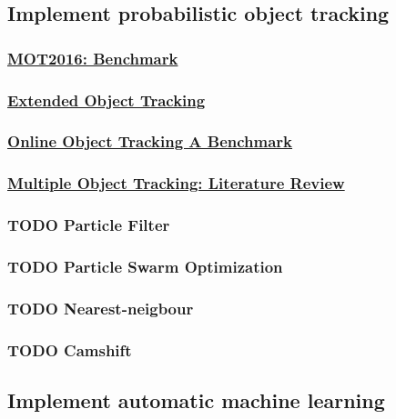 \documentclass[11pt]{article}
\begin{document}
\subsection{Implement probabilistic object tracking}
\label{sec:org3d32657}
\subsubsection{\href{https://arxiv.org/pdf/1603.00831.pdf}{MOT2016: Benchmark}}
\label{sec:orgb1dbb31}
\subsubsection{\href{https://arxiv.org/pdf/1604.00970.pdf}{Extended Object Tracking}}
\label{sec:orgf974e2d}
\subsubsection{\href{http://www.cv-foundation.org/openaccess/content\_cvpr\_2013/papers/Wu\_Online\_Object\_Tracking\_2013\_CVPR\_paper.pdf}{Online Object Tracking A Benchmark}}
\label{sec:org74ab8bf}
\subsubsection{\href{https://arxiv.org/pdf/1409.7618.pdf}{Multiple Object Tracking: Literature Review}}
\label{sec:org28e1680}
\subsubsection{{\bfseries\sffamily TODO} Particle Filter}
\label{sec:org98fdc6c}
\subsubsection{{\bfseries\sffamily TODO} Particle Swarm Optimization}
\label{sec:org6cd06dd}
\subsubsection{{\bfseries\sffamily TODO} Nearest-neigbour}
\label{sec:orgcd6c2ff}
\subsubsection{{\bfseries\sffamily TODO} Camshift}
\label{sec:org58fa6a2}
\subsection{Implement automatic machine learning}
\label{sec:org6eeb702}
\end{document}
